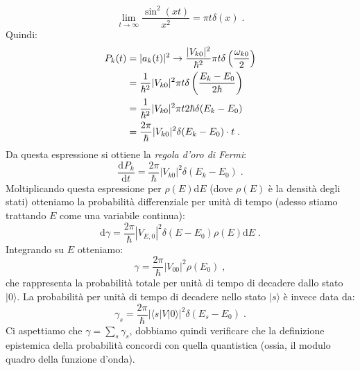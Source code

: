 \documentclass[10pt,a4paper]{report}
\theoremstyle{definition}
\newcommand{\dev}[3][]{\frac{\mathrm{d}^{#1} #2}{\mathrm{d} #3^{#1}}}
\numberwithin{equation}{section}
\newcommand{\diff}[1][]{\mathrm{d}#1}
\newcommand{\bra}{\langle}
\newcommand{\ket}{\rangle}
\begin{document}
\begin{equation}
\lim_{t\to\infty}\frac{\sin^2(xt)}{x^2}=\pi t\delta(x)\;.
\end{equation}
Quindi:
\begin{align}
P_k(t)&=|a_k(t)|^2\to \frac{|V_{k0}|^2}{\hbar^2}\pi t\delta\left(\frac{\omega_{k0}}{2}\right) \notag \\
&=\frac{1}{\hbar^2}|V_{k0}|^2\pi t\delta\left(\frac{E_k-E_0}{2\hbar}\right) \notag \\
&= \frac{1}{\hbar^2}|V_{k0}|^2\pi t 2\hbar\delta(E_k-E_0) \notag \\
&=\frac{2\pi}{\hbar}|V_{k0}|^2\delta(E_k-E_0) \cdot t\;.
\end{align}
Da questa espressione si ottiene la \textit{regola d'oro di Fermi}:
\begin{equation}
\dev{P_k}{t}=\frac{2\pi}{\hbar}|V_{k0}|^2\delta(E_k-E_0)\;.
\end{equation}
Moltiplicando questa espressione per $\rho(E)\diff{E}$ (dove $\rho(E)$ è la densità degli stati) otteniamo la probabilità differenziale per unità di tempo (adesso stiamo trattando $E$ come una variabile continua):
\begin{equation}
\diff{\gamma}=\frac{2\pi}{\hbar}|V_{E,0}|^2\delta(E-E_0)\rho(E)\diff{E}\;.
\end{equation}
Integrando su $E$ otteniamo:
\begin{equation}
\gamma=\frac{2\pi}{\hbar}|V_{00}|^2\rho(E_0)\;,
\end{equation}
che rappresenta la probabilità totale per unità di tempo di decadere dallo stato $|0\ket$. La probabilità per unità di tempo di decadere nello stato $|s\ket$ è invece data da:
\begin{equation}
\gamma_s=\frac{2\pi}{\hbar}|\bra s|V|0\ket|^2\delta(E_s-E_0)\;.
\end{equation}
Ci aspettiamo che $\gamma=\sum_s \gamma_s$, dobbiamo quindi verificare che la definizione epistemica della probabilità concordi con quella quantistica (ossia, il modulo quadro della funzione d'onda).
\end{document}
